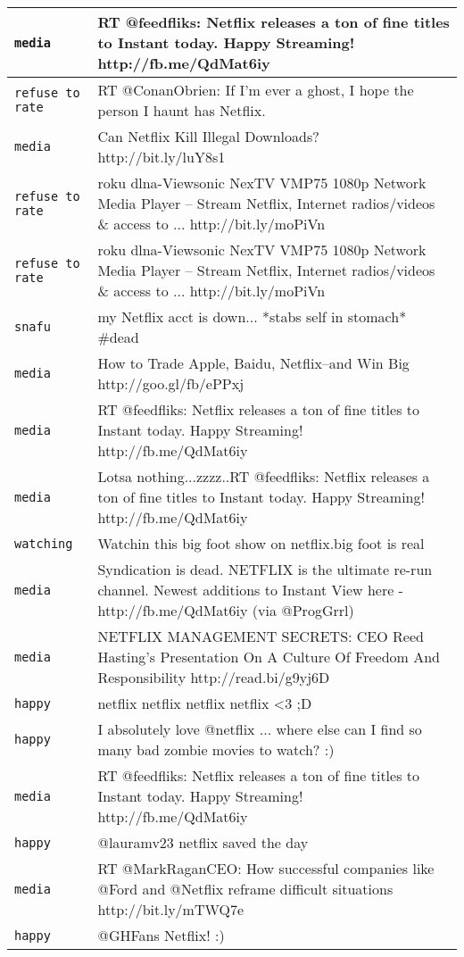 \begin{center}
\begin{longtable}{|l|p{120mm}|}
      \tabularnewline\hline
         \texttt{media} & RT @feedfliks: Netflix releases a ton of fine titles to Instant today. Happy Streaming! http://fb.me/QdMat6iy
      \tabularnewline\hline
         \texttt{refuse to rate} & RT @ConanObrien: If I'm ever a ghost, I hope the person I haunt has Netflix.
      \tabularnewline\hline
         \texttt{media} & Can Netflix Kill Illegal Downloads? http://bit.ly/luY8s1
      \tabularnewline\hline
         \texttt{refuse to rate} & roku dlna-Viewsonic NexTV VMP75 1080p Network Media Player -- Stream Netflix, Internet radios/videos \& access to ... http://bit.ly/moPiVn
      \tabularnewline\hline
         \texttt{refuse to rate} & roku dlna-Viewsonic NexTV VMP75 1080p Network Media Player -- Stream Netflix, Internet radios/videos \& access to ... http://bit.ly/moPiVn
      \tabularnewline\hline
         \texttt{snafu} & my Netflix acct is down... *stabs self in stomach* \#dead
      \tabularnewline\hline
         \texttt{media} & How to Trade Apple, Baidu, Netflix--and Win Big http://goo.gl/fb/ePPxj
      \tabularnewline\hline
         \texttt{media} & RT @feedfliks: Netflix releases a ton of fine titles to Instant today. Happy Streaming! http://fb.me/QdMat6iy
      \tabularnewline\hline
         \texttt{media} & Lotsa nothing...zzzz..RT @feedfliks: Netflix releases a ton of fine titles to Instant today. Happy Streaming! http://fb.me/QdMat6iy
      \tabularnewline\hline
         \texttt{watching} & Watchin this big foot show on netflix.big foot is real
      \tabularnewline\hline
         \texttt{media} & Syndication is dead. NETFLIX is the ultimate re-run channel. Newest additions to Instant View here - http://fb.me/QdMat6iy (via @ProgGrrl)
      \tabularnewline\hline
         \texttt{media} & NETFLIX MANAGEMENT SECRETS: CEO Reed Hasting's Presentation On A Culture Of Freedom And Responsibility http://read.bi/g9yj6D
      \tabularnewline\hline
         \texttt{happy} & netflix netflix netflix netflix <3 ;D
      \tabularnewline\hline
         \texttt{happy} & I absolutely love @netflix ... where else can I find so many bad zombie movies to watch? :)
      \tabularnewline\hline
         \texttt{media} & RT @feedfliks: Netflix releases a ton of fine titles to Instant today. Happy Streaming! http://fb.me/QdMat6iy
      \tabularnewline\hline
         \texttt{happy} & @lauramv23 netflix saved the day
      \tabularnewline\hline
         \texttt{media} & RT @MarkRaganCEO: How successful companies like @Ford and @Netflix reframe difficult situations http://bit.ly/mTWQ7e
      \tabularnewline\hline
         \texttt{happy} & @GHFans Netflix! :)

\end{longtable}
\end{center}

